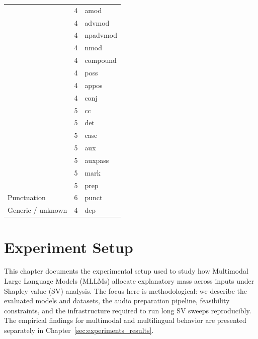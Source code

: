 \begin{table}[h!]
\begin{minipage}[t]{0.48\textwidth}
\begin{tabular}{p{3.5cm} c l}
 & 4 & amod \\
 & 4 & advmod \\
 & 4 & npadvmod \\
 & 4 & nmod \\
 & 4 & compound \\
 & 4 & poss \\
 & 4 & appos \\
\midrule
{}
 & 4 & conj \\
 & 5 & cc \\
\midrule
{}
 & 5 & det \\
 & 5 & case \\
 & 5 & aux \\
 & 5 & auxpass \\
 & 5 & mark \\
 & 5 & prep \\
\midrule
Punctuation & 6 & punct \\
\midrule
Generic / unknown & 4 & dep \\
\bottomrule
\end{tabular}
\end{minipage}

\end{table}

\chapter{Experiment Setup}
\label{sec:experiments}\label{sec:experiments_setup}

This chapter documents the experimental setup used to study how Multimodal Large Language Models (MLLMs) allocate explanatory mass across inputs under Shapley value (SV) analysis. The focus here is methodological: we describe the evaluated models and datasets, the audio preparation pipeline, feasibility constraints, and the infrastructure required to run long SV sweeps reproducibly. The empirical findings for multimodal and multilingual behavior are presented separately in Chapter~\ref{sec:experiments_results}.

